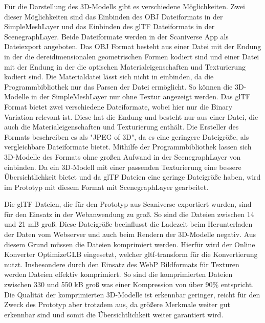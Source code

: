 Für die Darstellung des 3D-Modells gibt es verschiedene Möglichkeiten. Zwei dieser Möglichkeiten sind das Einbinden des \ac{OBJ} Dateiformats in der SimpleMeshLayer 
und das Einbinden des \ac{glTF} Dateiformats in der ScenegraphLayer.
Beide Dateiformate werden in der Scaniverse App als Dateiexport angeboten. Das \ac{OBJ} Format besteht aus einer Datei mit der Endung \obj{} in der die dereidimensionalen geometrischen Formen kodiert sind und einer Datei mit der Endung \mtl{} in der die optischen Materialeigenschaften und Texturierung kodiert sind. 
Die Materialdatei lässt sich nicht in \deckgl{} einbinden, da die \loadersgl{} Programmbibliothek nur das Parsen der \obj{} Datei ermöglicht.
So können die 3D-Modelle in der SimpleMeshLayer nur ohne Textur angezeigt werden. Das \ac{glTF} Format bietet zwei verschiedene Dateiformate, wobei hier nur die Binary Variation relevant ist. Diese hat die Endung \glb{} und besteht nur aus einer Datei, die auch die Materialeigenschaften und Texturierung enthält.
Die Ersteller des Formats beschreiben es als "JPEG of 3D", da es eine geringere Dateigröße, als vergleichbare Dateiformate bietet.
Mithilfe der \loadersgl{} Programmbibliothek lassen sich 3D-Modelle des Formats ohne großen Aufwand in der ScenegraphLayer von \deckgl{} einbinden. 
Da ein 3D-Modell mit einer passenden Texturierung eine bessere Übersichtlichkeit bietet und da \ac{glTF} Dateien eine geringe Dateigröße haben, wird im Prototyp mit diesem Format mit ScenegraphLayer gearbeitet.

Die \ac{glTF} Dateien, die für den Prototyp aus Scaniverse exportiert wurden, sind für den Einsatz in der Webanwendung zu groß. So sind die Dateien zwischen 14 und 21 \ac{mB} groß. 
Diese Dateigröße beeinflusst die Ladezeit beim Herunterladen der Daten vom Webserver und auch beim Rendern der 3D-Modelle negativ. Aus diesem Grund müssen die Dateien komprimiert werden. Hierfür wird der Online Konverter OptimizeGLB eingesetzt, welcher gltf-transform für die Konvertierung nutzt. Insbesondere durch den Einsatz des \ac{WebP} Bildformats für Texturen werden Dateien effektiv komprimiert. 
So sind die komprimierten Dateien zwischen 330 und 550 \ac{kB} groß was einer Kompression von über 90\% entspricht.
Die Qualität der komprimierten 3D-Modelle ist erkennbar geringer, reicht für den Zweck des Prototyp aber trotzdem aus, da größere Merkmale weiter gut erkennbar sind und somit die Übersichtlichkeit weiter garantiert wird.

